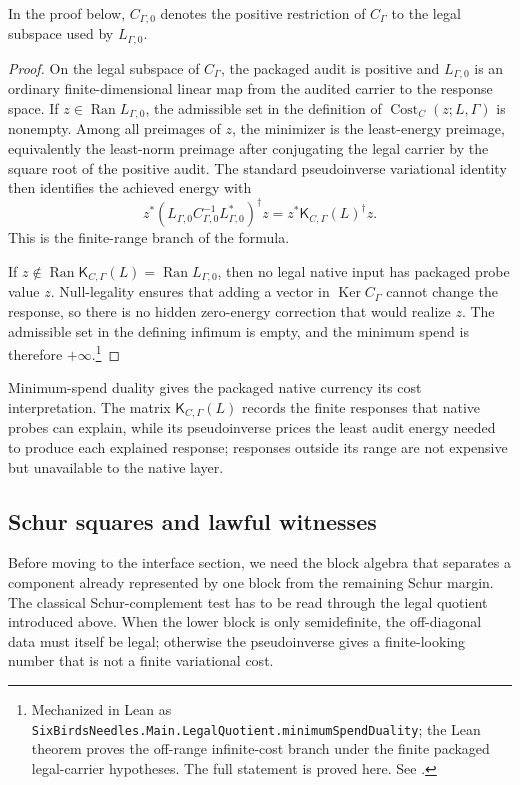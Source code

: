 \documentclass[11pt]{article}
\DeclareMathOperator{\Cost}{Cost}
\DeclareMathOperator{\Ran}{Ran}
\DeclareMathOperator{\Ker}{Ker}
\newcommand{\K}{\mathsf K}
\theoremstyle{definition}
\begin{document}
In the proof below, \(C_{\Gamma,0}\) denotes the positive restriction
of \(C_\Gamma\) to the legal subspace used by \(L_{\Gamma,0}\).

\begin{proof}
On the legal subspace of \(C_\Gamma\), the packaged audit is positive
and \(L_{\Gamma,0}\) is an ordinary finite-dimensional linear map from
the audited carrier to the response space.  If
\(z\in\Ran L_{\Gamma,0}\), the admissible set in the definition of
\(\Cost_C(z;L,\Gamma)\) is nonempty.  Among all preimages of \(z\), the
minimizer is the least-energy preimage, equivalently the least-norm
preimage after conjugating the legal carrier by the square root of the
positive audit.  The standard pseudoinverse variational identity
\citep{BoydVandenberghe2004Convex} then
identifies the achieved energy with
\[
  z^*(L_{\Gamma,0}C_{\Gamma,0}^{-1}L_{\Gamma,0}^*)^\dagger z
  =z^*\K_{C,\Gamma}(L)^\dagger z.
\]
This is the finite-range branch of the formula.

If \(z\notin\Ran\K_{C,\Gamma}(L)=\Ran L_{\Gamma,0}\), then no legal
native input has packaged probe value \(z\).  Null-legality ensures
that adding a vector in \(\Ker C_\Gamma\) cannot change the response,
so there is no hidden zero-energy correction that would realize
\(z\).  The admissible set in the defining infimum is empty, and the
minimum spend is therefore \(+\infty\).\footnote{Mechanized in Lean as
\texttt{SixBirdsNeedles.Main.LegalQuotient.minimumSpendDuality}; the Lean
theorem proves the off-range infinite-cost branch under the finite
packaged legal-carrier hypotheses.  The full statement is proved here.
See .}
\end{proof}

Minimum-spend duality gives the packaged native currency its cost
interpretation.  The matrix \(\K_{C,\Gamma}(L)\) records the finite
responses that native probes can explain, while its pseudoinverse
prices the least audit energy needed to produce each explained
response; responses outside its range are not expensive but unavailable
to the native layer.

\subsection{Schur squares and lawful witnesses}

Before moving to the interface section, we need the block algebra that
separates a component already represented by one block from the
remaining Schur margin.  The classical Schur-complement test
\citep{Schur1917Potenzreihen,Zhang2005SchurApplications,HornJohnson2013MatrixAnalysis}
has to be read through the legal quotient introduced above.  When the lower block
is only semidefinite, the off-diagonal data must itself be legal;
otherwise the pseudoinverse gives a finite-looking number that is not a
finite variational cost.
\end{document}
